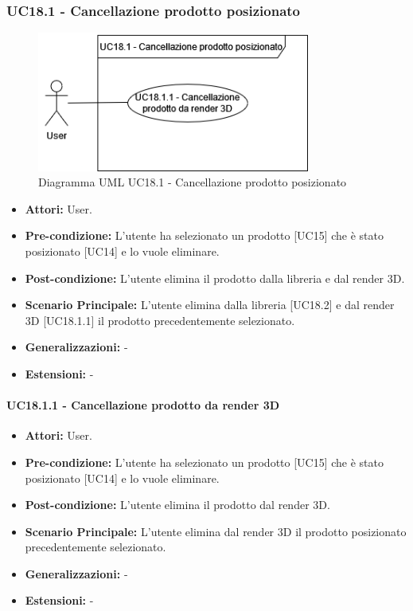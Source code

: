 \subsubsection{UC18.1 - Cancellazione prodotto posizionato}
\begin{figure}[H]
  \centering
  \includegraphics[width=0.8\textwidth]{UC_diagrams_11-20/UC18.1.drawio.png}
   \caption{Diagramma UML UC18.1 - Cancellazione prodotto posizionato}
\end{figure}
\begin{itemize}
    \item \textbf{Attori:} User.
    \item \textbf{Pre-condizione:} L'utente ha selezionato un prodotto [UC15] che è stato posizionato [UC14] e lo vuole eliminare.
    \item \textbf{Post-condizione:} L'utente elimina il prodotto dalla libreria e dal render 3D.
    \item \textbf{Scenario Principale:} L'utente elimina dalla libreria [UC18.2] e dal render 3D [UC18.1.1] il prodotto precedentemente selezionato.   
    \item \textbf{Generalizzazioni:} -
    \item \textbf{Estensioni:} -
\end{itemize}


\paragraph{UC18.1.1 - Cancellazione prodotto da render 3D}
\begin{itemize}
    \item \textbf{Attori:} User.
    \item \textbf{Pre-condizione:} L'utente ha selezionato un prodotto [UC15] che è stato posizionato [UC14] e lo vuole eliminare.
    \item \textbf{Post-condizione:} L'utente elimina il prodotto dal render 3D.
    \item \textbf{Scenario Principale:} L'utente elimina dal render 3D il prodotto posizionato precedentemente selezionato.   
    \item \textbf{Generalizzazioni:} -
    \item \textbf{Estensioni:} -
\end{itemize}


